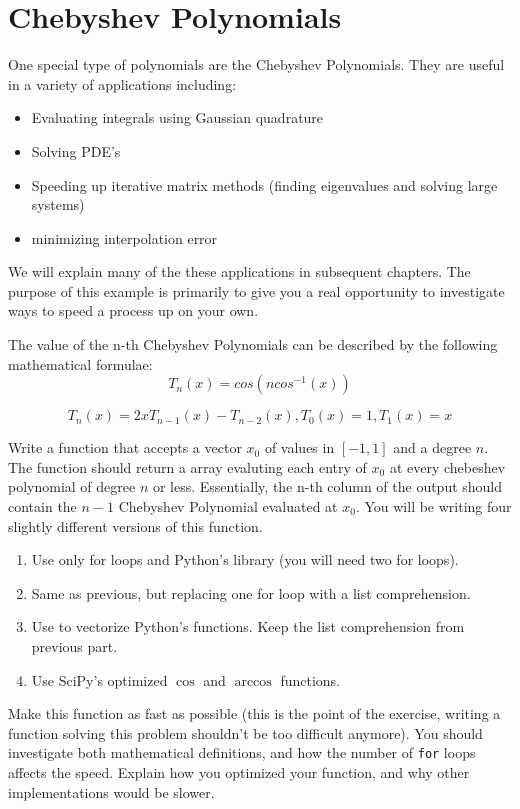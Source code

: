 \section*{Chebyshev Polynomials}

One special type of polynomials are the Chebyshev Polynomials. They are useful in a variety of applications including:
\begin{itemize}
\item Evaluating integrals using Gaussian quadrature
\item Solving PDE's
\item Speeding up iterative matrix methods (finding eigenvalues and solving large systems)
\item minimizing interpolation error
\end{itemize}

We will explain many of the these applications in subsequent chapters. The purpose of this example is primarily to give you a real opportunity to investigate ways to speed a process up on your own.

The value of the n-th Chebyshev Polynomials can be described by the following mathematical formulae\footnotemark :
\[
T_n(x) = cos(n cos^{-1}(x))
\]

\[
T_n(x) = 2xT_{n-1}(x) - T_{n-2}(x), T_0(x) = 1, T_1(x) = x
\]


\begin{problem}
Write a function that accepts a vector $x_0$ of values in $[-1,1]$ and a degree $n$.  The function should return a array evaluting each entry of $x_0$ at every chebeshev polynomial of degree $n$ or less. Essentially, the n-th column of the output should contain the $n-1$ Chebyshev Polynomial evaluated at $x_0$. 
You will be writing four slightly different versions of this function.
\begin{enumerate}
\item Use only for loops and Python's  library (you will need two for loops).
\item Same as previous, but replacing one for loop with a list comprehension.
\item Use  to vectorize Python's  functions.  Keep the list comprehension from previous part.
\item Use SciPy's optimized $\cos$ and $\arccos$ functions.
\end{enumerate}
Make this function as fast as possible (this is the point of the exercise, writing a function solving this problem shouldn't be too difficult anymore). You should investigate both mathematical definitions, and how the number of {\tt for} loops affects the speed. Explain how you optimized your function, and why other implementations would be slower.
\end{problem}
